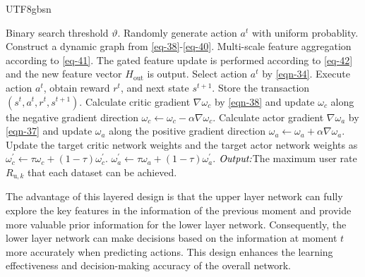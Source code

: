 \documentclass[lettersize,journal]{IEEEtran}
\begin{document}
\begin{CJK}{UTF8}{gbsn}
\begin{algorithm}[t]
\begin{algorithmic}[1]
	        		\State Binary search threshold $\vartheta$.
		            \State Randomly generate action $a^t$ with uniform probablity. 
		        \Else
		        	  \State Construct a dynamic graph from \eqref{eq-38}-\eqref{eq-40}.
		        	  \State Multi-scale feature aggregation according to \eqref{eq-41}.
		        	  \State The gated feature update is performed according to \eqref{eq-42} and the new feature vector $H_{\text{out}}$ is output.
		            \State Select action $a^t$ by \eqref{eqn-34}.
		        \EndIf
		        \State Execute action $a^t$, obtain reward $r^t$, and next state $s^{t+1}$.
		        \State Store the transaction$(s^{t},a^{t},r^{t},s^{t+1})$.
		        \State Calculate critic gradient $\nabla \omega _c$ by \eqref{eqn-38} and update $\omega _c $ along the negative gradient direction $\omega _c\longleftarrow \omega _c-\alpha \nabla \omega _c$.
		        \State Calculate actor gradient $\nabla \omega _a$ by \eqref{eqn-37} and update $\omega _a $ along the positive gradient direction $\omega _a\longleftarrow \omega _a+\alpha \nabla \omega _a$.
		        \State Update the target critic network weights and the target actor network weights as
		        \State \hspace{6mm}$\omega  _c^{'}\longleftarrow \tau \omega  _c+(1-\tau )\omega  _c^{'}$.
		        \State \hspace{6mm}$\omega  _a^{'}\longleftarrow \tau \omega  _a+(1-\tau )\omega  _a^{'}$.
	        \EndFor
        \EndFor
        \State $\emph{Output:}$The maximum user rate $R _{\text{u},k}$ that each dataset can be achieved. %
		\end{algorithmic}
\end{algorithm}


The advantage of this layered design is that the upper layer network can fully explore the key features in the information of the previous moment and provide more valuable prior information for the lower layer network. Consequently, the lower layer network can make decisions based on the information at moment $t$ more accurately when predicting actions. This design enhances the learning effectiveness and decision-making accuracy of the overall network.


\end{CJK}
\end{document}

